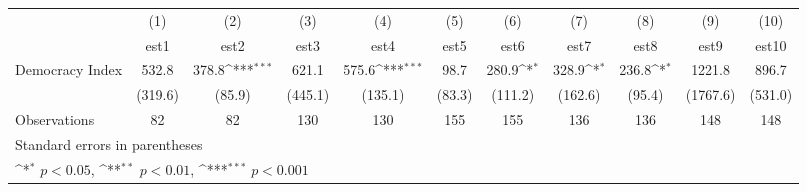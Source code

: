 {
\def\sym#1{\ifmmode^{#1}\else\(^{#1}\)\fi}
\begin{tabular}{l*{10}{c}}
\hline\hline
                    &\multicolumn{1}{c}{(1)}         &\multicolumn{1}{c}{(2)}         &\multicolumn{1}{c}{(3)}         &\multicolumn{1}{c}{(4)}         &\multicolumn{1}{c}{(5)}         &\multicolumn{1}{c}{(6)}         &\multicolumn{1}{c}{(7)}         &\multicolumn{1}{c}{(8)}         &\multicolumn{1}{c}{(9)}         &\multicolumn{1}{c}{(10)}         \\
                    &        est1         &        est2         &        est3         &        est4         &        est5         &        est6         &        est7         &        est8         &        est9         &       est10         \\
\hline
Democracy Index     &       532.8         &       378.8\sym{***}&       621.1         &       575.6\sym{***}&        98.7         &       280.9\sym{*}  &       328.9\sym{*}  &       236.8\sym{*}  &      1221.8         &       896.7         \\
                    &     (319.6)         &      (85.9)         &     (445.1)         &     (135.1)         &      (83.3)         &     (111.2)         &     (162.6)         &      (95.4)         &    (1767.6)         &     (531.0)         \\
\hline
Observations        &          82         &          82         &         130         &         130         &         155         &         155         &         136         &         136         &         148         &         148         \\
\hline\hline
\multicolumn{11}{l}{\footnotesize Standard errors in parentheses}\\
\multicolumn{11}{l}{\footnotesize \sym{*} \(p<0.05\), \sym{**} \(p<0.01\), \sym{***} \(p<0.001\)}\\
\end{tabular}
}

